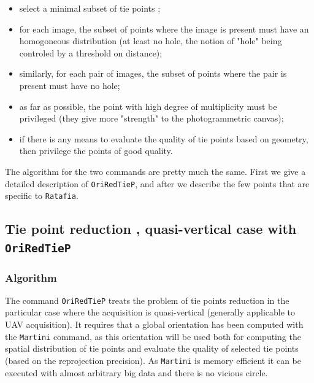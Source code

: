 \begin{itemize}
   \item select a minimal subset of tie points ;
   \item for each image, the subset of points where the image is present must have an homogoneous distribution
         (at least no hole, the notion of "hole" being controled by a threshold on distance);
   \item similarly, for each pair of images, the subset of points where the pair is present must have no hole;
   \item as far as possible, the point with high degree of multiplicity must be privileged (they give
         more "strength" to the photogrammetric canvas);

   \item if there is any means to evaluate the quality of tie points based on geometry, then privilege the points
         of good quality.

\end{itemize}

The algorithm for the two commands are pretty much the same. First we give a detailed description of {\tt OriRedTieP},
and after we describe  the few points that are  specific to {\tt Ratafia}.


\subsection{Tie point reduction , quasi-vertical case with {\tt OriRedTieP}}



\subsubsection{Algorithm}

\label{TiePSel:GlobAlgo}

The command {\tt OriRedTieP} treats the problem of tie points reduction in the particular case
where the acquisition is quasi-vertical (generally applicable to UAV acquisition). 
It requires that a global orientation has been computed with the {\tt Martini}
command, as this orientation will be used both for computing the spatial distribution of
tie points and evaluate the quality of selected tie points (based on the reprojection precision).  As {\tt Martini} is memory efficient it can be executed
with almost arbitrary big data and there is no vicious circle.

